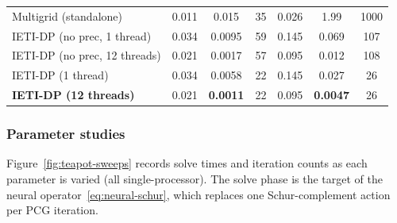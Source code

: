 \documentclass{article}
\theoremstyle{plain}
\numberwithin{equation}{section}
\begin{document}
\begin{table}[t]
\begin{tabular}{lcccccc}
        Multigrid (standalone)        & 0.011                                       & 0.015           & 35    & 0.026     & 1.99            & 1000  \\
        IETI-DP (no prec, 1 thread)   & 0.034                                       & 0.0095          & 59    & 0.145     & 0.069           & 107   \\
        IETI-DP (no prec, 12 threads) & 0.021                                       & 0.0017          & 57    & 0.095     & 0.012           & 108   \\
        IETI-DP (1 thread)            & 0.034                                       & 0.0058          & 22    & 0.145     & 0.027           & 26    \\
        \textbf{IETI-DP (12 threads)} & 0.021                                       & \textbf{0.0011} & 22    & 0.095     & \textbf{0.0047} & 26    \\
        \bottomrule
    \end{tabular}
\end{table}

\subsubsection{Parameter studies} \label{subsubsec:bench-3d-sweeps}

Figure~\ref{fig:teapot-sweeps} records solve times and iteration counts as each
parameter is varied (all single-processor).
The solve phase is the target of the neural
operator~\eqref{eq:neural-schur}, which replaces one Schur-complement action
per PCG iteration.
\end{document}
